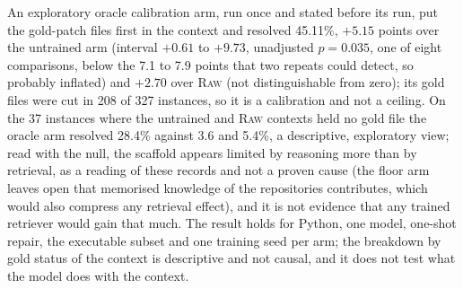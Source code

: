 \documentclass[10pt,twocolumn]{article}
\begin{document}
An exploratory oracle calibration arm, run once and stated before its run, put the gold-patch files first in the context and resolved 45.11\%, $+5.15$ points over the untrained arm (interval $+0.61$ to $+9.73$, unadjusted $p=0.035$, one of eight comparisons, below the 7.1 to 7.9 points that two repeats could detect, so probably inflated) and $+2.70$ over \textsc{Raw} (not distinguishable from zero); its gold files were cut in 208 of 327 instances, so it is a calibration and not a ceiling. %
On the 37 instances where the untrained and \textsc{Raw} contexts held no gold file the oracle arm resolved 28.4\% against 3.6 and 5.4\%, a descriptive, exploratory view; read with the null, the scaffold appears limited by reasoning more than by retrieval, as a reading of these records and not a proven cause (the floor arm leaves open that memorised knowledge of the repositories contributes, which would also compress any retrieval effect), and it is not evidence that any trained retriever would gain that much. %
The result holds for Python, one model, one-shot repair, the executable subset and one training seed per arm; the breakdown by gold status of the context is descriptive and not causal, and it does not test what the model does with the context.
\end{document}
